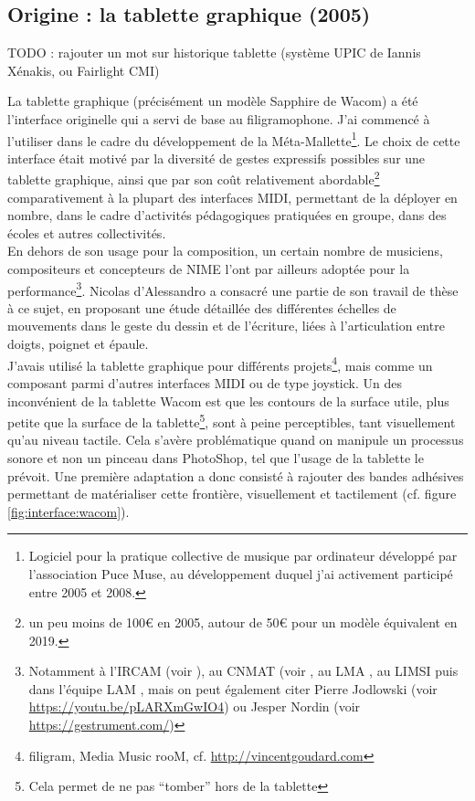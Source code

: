 \subsection{Origine : la tablette graphique (2005)}

TODO : rajouter un mot sur historique tablette (système UPIC de Iannis Xénakis, ou Fairlight CMI)

\noindent La tablette graphique (précisément un modèle Sapphire de Wacom) a été l’interface originelle qui a servi de base au filigramophone. J’ai commencé à l’utiliser dans le cadre du développement de la Méta-Mallette\footnote{Logiciel pour la pratique collective de musique par ordinateur développé par l’association Puce Muse, au développement duquel j'ai activement participé entre 2005 et 2008.}. Le choix de cette interface était motivé par la diversité de gestes expressifs possibles sur une tablette graphique, ainsi que par son coût relativement abordable\footnote{un peu moins de 100€ en 2005, autour de 50€ pour un modèle équivalent en 2019.} comparativement à la plupart des interfaces \gls{MIDI}, permettant de la déployer en nombre, dans le cadre d'activités pédagogiques pratiquées en groupe, dans des écoles et autres collectivités.\\
\indent En dehors de son usage pour la composition, un certain nombre de musiciens, compositeurs et concepteurs de \gls{NIME} l’ont par ailleurs adoptée pour la performance\footnote{Notamment à l'\gls{IRCAM} (voir \cite{wanderley_choice_2000}), au \gls{CNMAT} (voir \cite{zbyszynski_ten_2007}, au \gls{LMA} \cite{couturier_utilisation_2004}, au \gls{LIMSI} \cite{feugere_chorus_2011} puis dans l'équipe \gls{LAM} \cite{xiao_t-voks_2019}, mais on peut également citer Pierre Jodlowski (voir \url{https://youtu.be/pLARXmGwIO4}) ou Jesper Nordin (voir \url{https://gestrument.com/})}. Nicolas d’Alessandro a consacré une partie de son travail de thèse \cite{dalessandro_realtime_2009} à ce sujet, en proposant une étude détaillée des différentes échelles de mouvements dans le geste du dessin et de l'écriture, liées à l'articulation entre doigts, poignet et épaule.\\
\indent J'avais utilisé la tablette graphique pour différents projets\footnote{filigram, Media Music rooM, cf. \url{http://vincentgoudard.com}}, mais comme un composant parmi d'autres interfaces \gls{MIDI} ou de type joystick.
\indent Un des inconvénient de la tablette Wacom est que les contours de la surface utile, plus petite que la surface de la tablette\footnote{Cela permet de ne pas ``tomber'' hors de la tablette}, sont à peine perceptibles, tant visuellement qu'au niveau tactile. Cela s'avère problématique quand on manipule un processus sonore et non un pinceau dans PhotoShop, tel que l'usage de la tablette le prévoit. Une première adaptation a donc consisté à rajouter des bandes adhésives permettant de matérialiser cette frontière, visuellement et tactilement (cf. figure \ref{fig:interface:wacom}).\\
